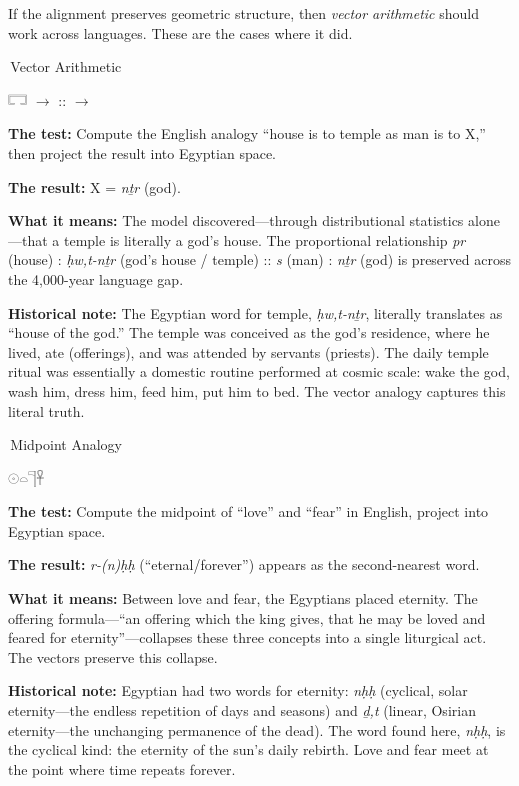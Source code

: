 \documentclass[11pt, a4paper]{article}
\newcommand{\bighiero}[1]{{\normalfont\hierofont\fontsize{48}{56}\selectfont #1}}
\newcommand{\displayglyph}[1]{%
  \begin{center}
  \bighiero{#1}
  \end{center}
  \vspace{-6pt}
}
\newcommand{\methodtag}[1]{%
  \noindent\colorbox{tagbg}{\small\sffamily\color{nightsky}\,#1\,}\par\smallskip%
}
\newenvironment{insightbox}[1][]{%
  \def\boxtitle{#1}%
  \begin{oframed}%
  \noindent{\bfseries\color{lapis}\boxtitle}\par\smallskip%
}{%
  \end{oframed}%
}
\begin{document}
\noindent
If the alignment preserves geometric structure, then \emph{vector arithmetic} should work across languages. These are the cases where it did.

\medskip

\begin{insightbox}[house : temple :: man : god]

\methodtag{Vector Arithmetic}

\begin{center}
\bighiero{𓉐} \quad $\rightarrow$ \quad \bighiero{𓊹𓉐} \quad :: \quad \bighiero{𓀀} \quad $\rightarrow$ \quad \bighiero{𓊹}
\end{center}

\textbf{The test:} Compute the English analogy ``house is to temple as man is to X,'' then project the result into Egyptian space.

\textbf{The result:} X = \textit{nṯr} (god).

\textbf{What it means:} The model discovered---through distributional statistics alone---that a temple is literally a god's house. The proportional relationship \textit{pr} (house) : \textit{ḥw,t-nṯr} (god's house / temple) :: \textit{s} (man) : \textit{nṯr} (god) is preserved across the 4,000-year language gap.

\textbf{Historical note:} The Egyptian word for temple, \textit{ḥw,t-nṯr}, literally translates as ``house of the god.'' The temple was conceived as the god's residence, where he lived, ate (offerings), and was attended by servants (priests). The daily temple ritual was essentially a domestic routine performed at cosmic scale: wake the god, wash him, dress him, feed him, put him to bed. The vector analogy captures this literal truth.
\end{insightbox}

\begin{insightbox}[love + fear = eternity]

\methodtag{Midpoint Analogy}

\displayglyph{𓇳𓏏𓊹𓋹}

\textbf{The test:} Compute the midpoint of ``love'' and ``fear'' in English, project into Egyptian space.

\textbf{The result:} \textit{r-(n)ḥḥ} (``eternal/forever'') appears as the second-nearest word.

\textbf{What it means:} Between love and fear, the Egyptians placed eternity. The offering formula---``an offering which the king gives, that he may be loved and feared for eternity''---collapses these three concepts into a single liturgical act. The vectors preserve this collapse.

\textbf{Historical note:} Egyptian had two words for eternity: \textit{nḥḥ} (cyclical, solar eternity---the endless repetition of days and seasons) and \textit{ḏ,t} (linear, Osirian eternity---the unchanging permanence of the dead). The word found here, \textit{nḥḥ}, is the cyclical kind: the eternity of the sun's daily rebirth. Love and fear meet at the point where time repeats forever.
\end{insightbox}
\end{document}
